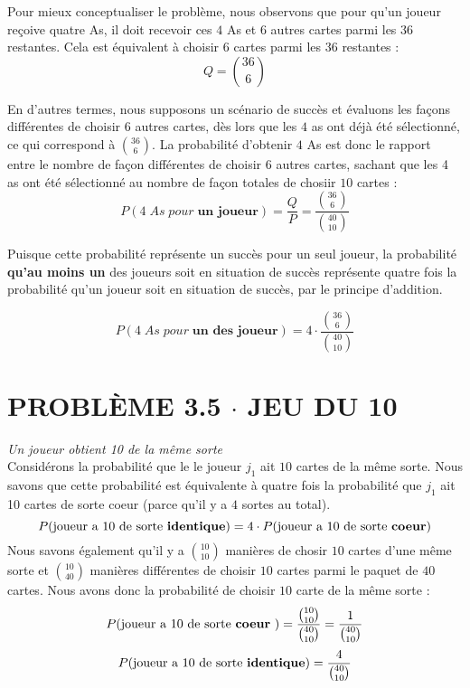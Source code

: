 \documentclass[8pt]{report}
\begin{document}
        Pour mieux conceptualiser le problème, nous observons que pour qu'un joueur reçoive quatre As, il doit recevoir 
        ces $4$ As et $6$ autres cartes parmi les $36$ restantes. Cela est équivalent à choisir 6 cartes parmi les $36$ 
        restantes : 
        \[ Q = {36 \choose 6} \] 

        En d'autres termes, nous supposons un scénario de succès et évaluons les façons différentes de choisir 
        $6$ autres cartes, dès lors que les $4$ as ont déjà été sélectionné, ce qui correspond à ${36 \choose 6}$. La 
        probabilité d'obtenir $4$ As est donc le rapport entre le nombre de façon différentes de choisir 
        $6$ autres cartes, sachant que les 4 as ont été sélectionné au nombre de façon totales de chosiir $10$ cartes :
        \[ P(4 \; As \; pour \; \textbf{un joueur}) = \dfrac{Q}{P} = \dfrac{{36 \choose 6}}{{40 \choose 10}} \]
        
        Puisque cette probabilité représente un succès pour un seul joueur, la probabilité \textbf{qu'au moins un} des 
        joueurs soit en situation de succès représente quatre fois la probabilité qu'un joueur soit en situation 
        de succès, par le principe d'addition.
        \begin{Reponse}{}{}
            \[P(4 \; As \; pour \; \textbf{un des joueur}) = 4\cdot\dfrac{{36 \choose 6}}{{40 \choose 10}} \]
        \end{Reponse} 

        \section*{\textnormal{PROBLÈME 3.5 \;\;\;\; $\cdot$ \;\;\;\; JEU DU 10 }} 
        \noindent \textcolor{myb}{\textit{Un joueur obtient 10 de la même sorte}} \\  
        \indent Considérons la probabilité que le le joueur $j_1$ ait $10$ cartes de la même sorte. 
        Nous savons que cette probabilité 
        est équivalente à quatre fois la probabilité que $j_1$ ait 10 cartes de sorte coeur (parce qu'il y a $4$ sortes au total). 
        \[ P(\text{joueur a 10 de sorte \textbf{identique}}) = 4 \cdot P(\text{joueur a 10 de sorte \textbf{coeur}}) \] 
        \indent Nous savons également qu'il y a ${10 \choose 10}$ manières de chosir $10$ cartes d'une même sorte et 
        ${ 10 \choose 40 }$ manières différentes de choisir $10$ cartes parmi le paquet de $40$ cartes. 
        Nous avons 
        donc la probabilité de choisir $10$ carte de la même sorte : 
        \[ P(\text{joueur a 10 de sorte \textbf{coeur}  }) =  
        \dfrac{{10 \choose 10}}{{40 \choose 10}} = \dfrac{1}{{40 \choose 10}} 
        \]
        \[ P(\text{joueur a 10 de sorte \textbf{identique}}) = \dfrac{4}{{40 \choose 10}} \] 
\end{document}
